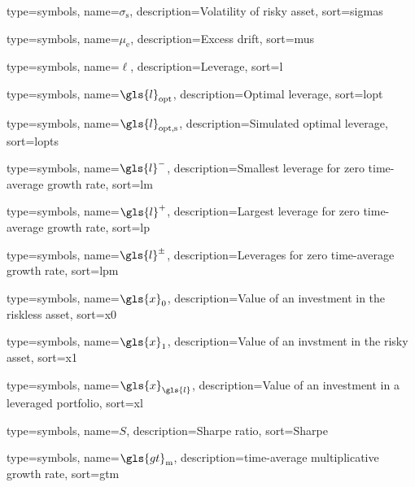 {
  type={symbols}, 
  name={\ensuremath{\sigma_\text{s}}},
  description={Volatility of risky asset},
  sort=sigmas
}

{
  type={symbols}, 
  name={\ensuremath{\mu_\text{e}}},
  description={Excess drift},
  sort=mus
}

{
  type={symbols}, 
  name={\ensuremath{\ell}},
  description={Leverage},
  sort=l
}

{
  type={symbols}, 
  name={\ensuremath{\gls{l}_\text{opt}}},
  description={Optimal leverage},
  sort=lopt
}

{
  type={symbols}, 
  name={\ensuremath{\gls{l}_\text{opt,s}}},
  description={Simulated optimal leverage},
  sort=lopts
}

{
  type={symbols}, 
  name={\ensuremath{\gls{l}^{-}}},
  description={Smallest leverage for zero time-average growth rate},
  sort=lm
}

{
  type={symbols}, 
  name={\ensuremath{\gls{l}^{+}}},
  description={Largest leverage for zero time-average growth rate},
  sort=lp
}

{
  type={symbols}, 
  name={\ensuremath{\gls{l}^{\pm}}},
  description={Leverages for zero time-average growth rate},
  sort=lpm
}

{
  type={symbols}, 
  name={\ensuremath{\gls{x}_0}},
  description={Value of an investment in the riskless asset},
  sort=x0
}

{
  type={symbols}, 
  name={\ensuremath{\gls{x}_1}},
  description={Value of an invstment in the risky asset},
  sort=x1
}

{
  type={symbols}, 
  name={\ensuremath{\gls{x}_{\gls{l}}}},
  description={Value of an investment in a leveraged portfolio},
  sort=xl
}

{
  type={symbols}, 
  name={\ensuremath{S}},
  description={Sharpe ratio},
  sort=Sharpe
}

{
  type={symbols}, 
  name={\ensuremath{\gls{gt}_\text{m}}},
  description={time-average multiplicative growth rate},
  sort=gtm
}
